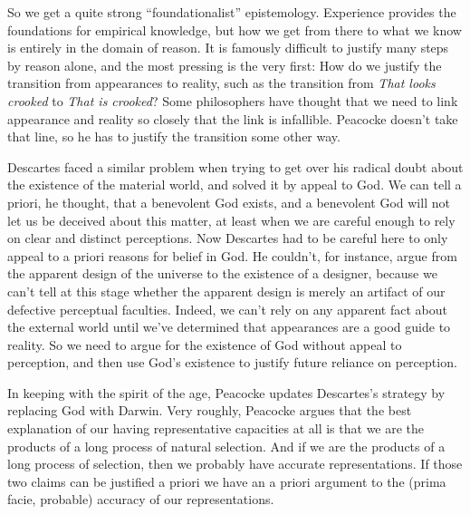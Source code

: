 \documentclass[
  10pt,
  letterpaper,
  DIV=11,
  numbers=noendperiod,
  twoside]{scrartcl}
\begin{document}
So we get a quite strong ``foundationalist'' epistemology. Experience
provides the foundations for empirical knowledge, but how we get from
there to what we know is entirely in the domain of reason. It is
famously difficult to justify many steps by reason alone, and the most
pressing is the very first: How do we justify the transition from
appearances to reality, such as the transition from \emph{That looks
crooked} to \emph{That is crooked}? Some philosophers have thought that
we need to link appearance and reality so closely that the link is
infallible. Peacocke doesn't take that line, so he has to justify the
transition some other way.

Descartes faced a similar problem when trying to get over his radical
doubt about the existence of the material world, and solved it by appeal
to God. We can tell a priori, he thought, that a benevolent God exists,
and a benevolent God will not let us be deceived about this matter, at
least when we are careful enough to rely on clear and distinct
perceptions. Now Descartes had to be careful here to only appeal to a
priori reasons for belief in God. He couldn't, for instance, argue from
the apparent design of the universe to the existence of a designer,
because we can't tell at this stage whether the apparent design is
merely an artifact of our defective perceptual faculties. Indeed, we
can't rely on any apparent fact about the external world until we've
determined that appearances are a good guide to reality. So we need to
argue for the existence of God without appeal to perception, and then
use God's existence to justify future reliance on perception.

In keeping with the spirit of the age, Peacocke updates Descartes's
strategy by replacing God with Darwin. Very roughly, Peacocke argues
that the best explanation of our having representative capacities at all
is that we are the products of a long process of natural selection. And
if we are the products of a long process of selection, then we probably
have accurate representations. If those two claims can be justified a
priori we have an a priori argument to the (prima facie, probable)
accuracy of our representations.
\end{document}
